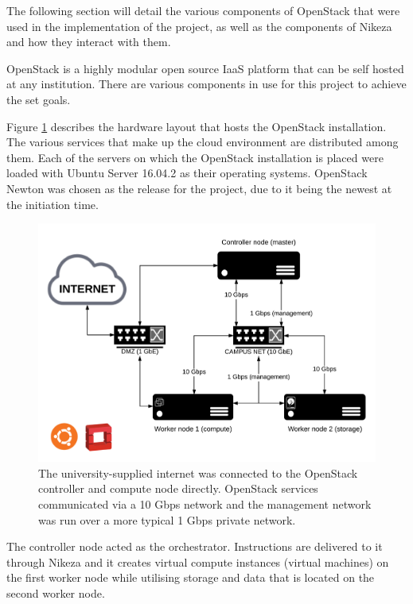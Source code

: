The following section will detail the various components of OpenStack that were used in the implementation of the project, as well as the components of Nikeza and how they interact with them.

OpenStack is a highly modular open source IaaS platform that can be self hosted at any institution. There are various components in use for this project to achieve the set goals.

Figure \ref{fig:network_layout} describes the hardware layout that hosts the OpenStack installation. The various services that make up the cloud environment are distributed among them. Each of the servers on which the OpenStack installation is placed were loaded with Ubuntu Server 16.04.2 as their operating systems. OpenStack Newton was chosen as the release for the project, due to it being the newest at the initiation time.

\begin{figure}[ht!]
\centering
\includegraphics[width=\textwidth]{Figures/3_hardware_layout_network.png}
\decoRule
\caption[OpenStack Hardware and Network Layout]{The university-supplied internet was connected to the OpenStack controller and compute node directly. OpenStack services communicated via a 10 Gbps network and the management network was run over a more typical 1 Gbps private network.}
\label{fig:network_layout}
\end{figure}

The controller node acted as the orchestrator. Instructions are delivered to it through Nikeza and it creates virtual compute instances (virtual machines) on the first worker node while utilising storage and data that is located on the second worker node.

